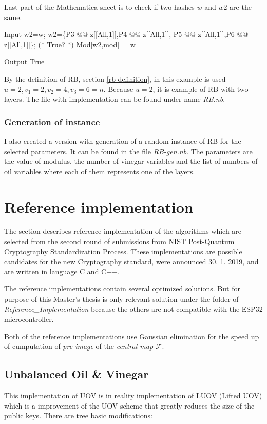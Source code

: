 \documentclass[thesis=M,english]{FITthesis}[2019/12/23]
\begin{document}
\bigskip
\noindent
Last part of the Mathematica sheet is to check if two hashes $w$ and $w2$ are the same.
\begin{mmaCell}[moredefined={w2, w, P5, P6, z, P4, P3, mod}]{Input}
  w2=w;
  w2=\{P3 @@ z[[All,1]],P4 @@ z[[All,1]],
      P5 @@ z[[All,1]],P6 @@ z[[All,1]]\};
  (* True? *)
  Mod[w2,mod]==w
\end{mmaCell}
\begin{mmaCell}[addtoindex=2]{Output}
  True
\end{mmaCell}
By the definition of RB, section \ref{rb-definition}, in this example is used $u=2, v_1=2, v_2=4, v_3=6=n$. Because $u=2$, it is example of RB with two layers.
The file with implementation can be found under name \textit{RB.nb}.

\subsubsection{Generation of instance}
I also created a version with generation of a random instance of RB for the selected parameters. It can be found in the file \textit{RB-gen.nb}. The parameters are the value of modulus, the number of vinegar variables and the list of numbers of oil variables where each of them represents one of the layers.

\newpage
\lstset{basicstyle=\footnotesize\ttfamily}
\section{Reference implementation}
The section describes reference implementation of the algorithms which are selected from the second round of submissions from NIST Post-Quantum Cryptography Standardization Process.\cite{L-NIST-2ND} These implementations are possible candidates for the new Cryptography standard, were announced 30. 1. 2019, and are written in language C and C++. 

\bigskip
\noindent
The reference implementations contain several optimized solutions. But for purpose of this Master's thesis is only relevant solution under the folder of \textit{Reference\_Implementation} because the others are not compatible with the ESP32 microcontroller.

\bigskip
\noindent
Both of the reference implementations use Gaussian elimination for the speed up of cumputation of \textit{pre-image} of the \textit{central map} $\mathcal{F}$.

\subsection{Unbalanced Oil \& Vinegar}
This implementation of UOV is in reality implementation of LUOV (Lifted UOV) which is a improvement of the UOV scheme that greatly reduces the size of the public keys. There are tree basic modifications:
\end{document}
